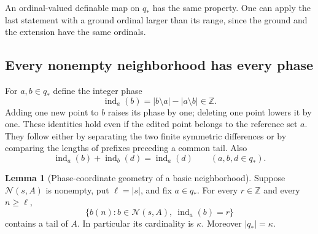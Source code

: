 \documentclass[11pt,letterpaper]{article}
\theoremstyle{definition}
\newtheorem{lemma}[definition]{Lemma}
\numberwithin{equation}{section}
\newcommand{\ch}{\operatorname{ind}}
\begin{document}
An ordinal-valued definable map on $q_*$ has the same property. One can
apply the last statement with a ground ordinal larger than its range,
since the ground and the extension have the same ordinals.

\subsection{Every nonempty neighborhood has every phase}

For $a,b\in q_*$ define the integer phase
\begin{equation}\label{eq:phase}
             \ch_a(b)=|b\setminus a|-|a\setminus b|\in\mathbb Z.
\end{equation}
Adding one new point to $b$ raises its phase by one; deleting one point
lowers it by one. These identities hold even if the edited point belongs
to the reference set $a$. They follow either by separating the two finite
symmetric differences or by comparing the lengths of prefixes preceding
a common tail. Also
\[
        \ch_a(b)+\ch_b(d)=\ch_a(d)
                      \qquad(a,b,d\in q_*).
\]

\begin{lemma}[Phase-coordinate geometry of a basic neighborhood]
\label{lem:geometry}
Suppose $\mathcal N(s,A)$ is nonempty, put $\ell=|s|$, and fix
$a\in q_*$. For every $r\in\mathbb Z$ and every $n\ge\ell$,
\[
 \{b(n):b\in\mathcal N(s,A),\ \ch_a(b)=r\}
\]
contains a tail of $A$. In particular its cardinality is $\kappa$.
Moreover $|q_*|=\kappa$.
\end{lemma}
\end{document}
